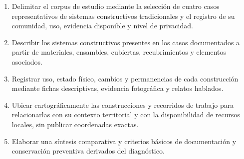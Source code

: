 
\begin{enumerate}
	\item{Delimitar el corpus de estudio mediante la selección de cuatro casos representativos de sistemas constructivos tradicionales y el registro de su comunidad, uso, evidencia disponible y nivel de privacidad.}

	\item{Describir los sistemas constructivos presentes en los casos documentados a partir de materiales, ensambles, cubiertas, recubrimientos y elementos asociados.}

	\item{Registrar uso, estado físico, cambios y permanencias de cada construcción mediante fichas descriptivas, evidencia fotográfica y relatos hablados.}

	\item{Ubicar cartográficamente las construcciones y recorridos de trabajo para relacionarlas con su contexto territorial y con la disponibilidad de recursos locales, sin publicar coordenadas exactas.}

	\item{Elaborar una síntesis comparativa y criterios básicos de documentación y conservación preventiva derivados del diagnóstico.}
\end{enumerate}

